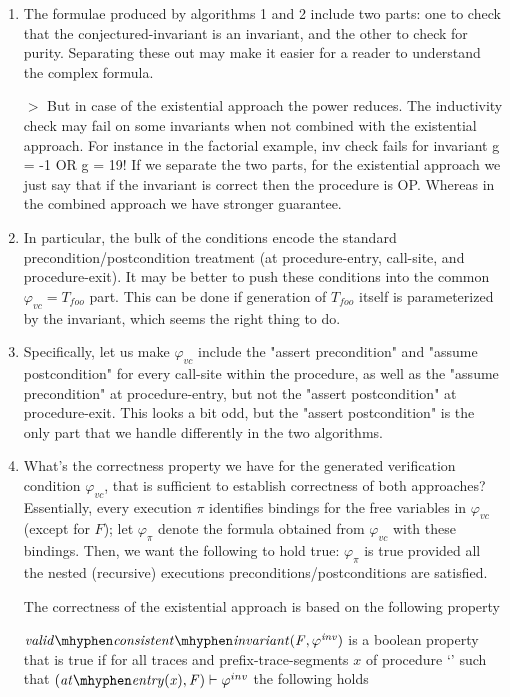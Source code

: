 \begin{enumerate}
\begin{enumerate}
\item The formulae produced by algorithms 1 and 2 include two parts:
one to check that the conjectured-invariant is an invariant, and the
other to check for purity. Separating these out may make it easier for
a reader to understand the complex formula.

$>$ But in case of the existential approach the power reduces. The
inductivity check may fail on some invariants when not combined with
the existential approach. For instance in the factorial example, inv
check fails for invariant g = -1 OR g = 19! If we separate the two
parts, for the existential approach we just say that if the invariant
is correct then the procedure is OP. Whereas in the combined approach
we have stronger guarantee. 

\item In particular, the bulk of the conditions encode the standard
precondition/postcondition treatment (at procedure-entry, call-site,
and procedure-exit). It may be better to push these conditions into
the common $\varphi_{vc} = T_{foo}$ part. This can be done if generation of
$T_{foo}$ itself is parameterized by the invariant, which seems the right thing to do.

\item Specifically, let us make $\varphi_{vc}$ include the "assert precondition"
and "assume postcondition" for every call-site within the procedure, as well
as the "assume precondition" at procedure-entry, but not the "assert
postcondition" at procedure-exit. This looks a bit odd, but the "assert
postcondition" is the only part that we handle differently in the two algorithms.

\item What's the correctness property we have for the generated verification
condition $\varphi_{vc}$, that is sufficient to establish correctness of both approaches?
Essentially, every execution $\pi$ identifies bindings for the free variables in $\varphi_{vc}$ (except for $F$);
let $\varphi_\pi$ denote the formula obtained from $\varphi_{vc}$ with these bindings.
Then, we want the following to hold true: $\varphi_\pi$ is true provided all the
nested (recursive) executions preconditions/postconditions are satisfied.

The correctness of the existential approach is based on the following property



\begin{definition}
  \label{def:validConsistentInvariant}
  $\\\vci{\F}{\inv}$ is a boolean property that is true if for all
  traces and prefix-trace-segments $x$ of procedure `\foo' such that
  $(\atEntry{x}, \F) \satisfies \inv$ the following holds


\end{definition}
\end{enumerate}
\end{enumerate}
